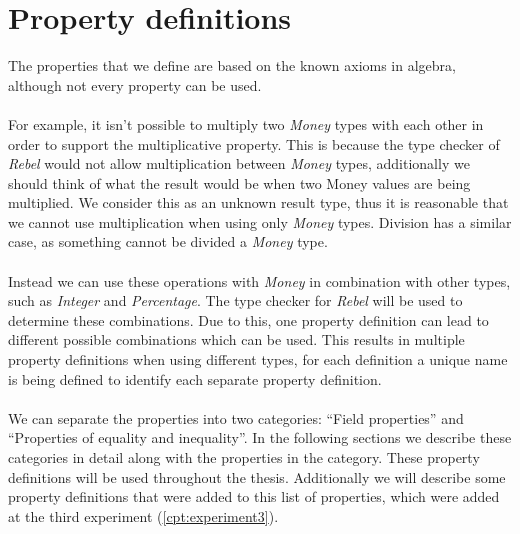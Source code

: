 \section{Property definitions}
\label{sct:properties_property_definitions}
The properties that we define are based on the known axioms in algebra, although
not every property can be used.\\
\\
For example, it isn't possible to multiply two
\textit{Money} types with each other in order to support the multiplicative
property. This is because the type checker of \textit{Rebel} would not allow
multiplication between \textit{Money} types, additionally we should think of
what the result would be when two Money values are being multiplied. We consider
this as an unknown result type, thus it is reasonable that we cannot use
multiplication when using only \textit{Money} types. Division has a similar
case, as something cannot be divided a \textit{Money} type.\\
\\
Instead we can use these operations with \textit{Money} in combination with
other types, such as \textit{Integer} and \textit{Percentage}. The type checker
for \textit{Rebel} will be used to determine these combinations. Due to this,
one property definition can lead to different possible combinations which can be
used. This results in multiple property definitions when using different types,
for each definition a unique name is being defined to identify each separate
property definition.\\
\\
We can separate the properties into two categories: ``Field properties'' and
``Properties of equality and inequality''. In the following sections we describe
these categories in detail along with the properties in the category. These
property definitions will be used throughout the thesis. Additionally we will
describe some property definitions that were added to this list of properties,
which were added at the third experiment (\autoref{cpt:experiment3}).


